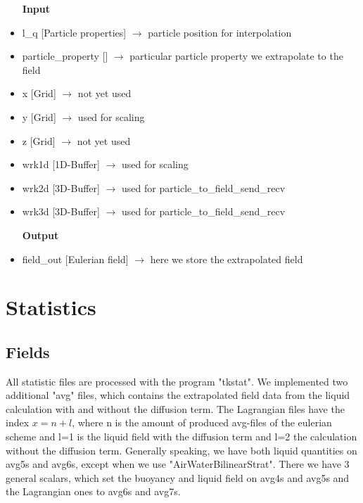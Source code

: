 \documentclass[12pt]{article}
\begin{document}
\begin{itemize}
	\item [\textbf{Input}]
	\item l\_q [Particle properties] $\rightarrow$ particle position for interpolation
	\item particle\_property [] $\rightarrow$ particular particle property we extrapolate to the field 
	\item x [Grid] $\rightarrow$ not yet used
	\item y [Grid] $\rightarrow$ used for scaling
	\item z [Grid] $\rightarrow$ not yet used
	\item wrk1d [1D-Buffer] $\rightarrow$ used for scaling
	\item wrk2d [3D-Buffer] $\rightarrow$ used for particle\_to\_field\_send\_recv
	\item wrk3d [3D-Buffer] $\rightarrow$ used for particle\_to\_field\_send\_recv
	\item [\textbf{Output}]
	\item field\_out [Eulerian field] $\rightarrow$ here we store the extrapolated field
	\end{itemize}
\section{Statistics}
\label{sec:statistics}
\subsection{Fields}
All statistic files are processed with the program "tkstat". We implemented two additional "avg" files, which contains the extrapolated field data from the liquid calculation with and without the diffusion term. The Lagrangian files have the index $x = n+l$, where n is the amount of produced avg-files of the eulerian scheme and l=1 is the liquid field with the diffusion term and l=2 the calculation without the diffusion term. \newline
Generally speaking, we have both liquid quantities on avg5s and avg6s, except when we use "AirWaterBilinearStrat". There we have 3 general scalars, which set the buoyancy and liquid field on avg4s and avg5s and the Lagrangian ones to avg6s and avg7s.
\end{document}
